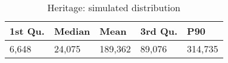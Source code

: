\begin{table}[ht]
\centering
\caption{Heritage: simulated distribution} 
\label{tab:heritage_simu}
\begin{tabular}{lllll}
  \hline
1st Qu. & Median & Mean & 3rd Qu. & P90 \\ 
  \hline
6,648 & 24,075 & 189,362 & 89,076 & 314,735 \\ 
   \hline
\end{tabular}
\end{table}

